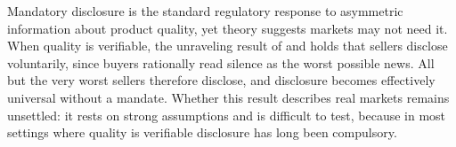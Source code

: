 Mandatory disclosure is the standard regulatory response to asymmetric information about
product quality, yet theory suggests markets may not need it. When quality is verifiable, the
unraveling result of \citet{grossman_informational_1981} and \citet{milgrom_good_1981} holds that sellers disclose
voluntarily, since buyers rationally read silence as the worst possible news. All but the very
worst sellers therefore disclose, and disclosure becomes effectively universal without a
mandate. Whether this result describes real markets remains unsettled: it rests on strong
assumptions and is difficult to test, because in most settings where quality is verifiable
disclosure has long been compulsory.

